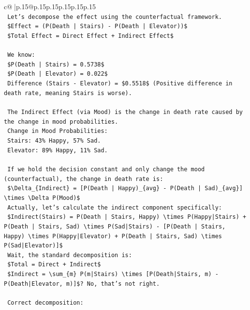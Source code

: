 \documentclass{article}
\begin{document}
{\begin{supertabular}{c@{$\;$}|p{.15\linewidth}@{}p{.15\linewidth}p{.15\linewidth}p{.15\linewidth}p{.15\linewidth}p{.15\linewidth}}
{{{\\ 
\texttt{    Let's decompose the effect using the counterfactual framework.} \\
\texttt{    \$Effect = (P(Death | Stairs) {-} P(Death | Elevator))\$} \\
\texttt{    \$Total Effect = Direct Effect + Indirect Effect\$} \\
\\ 
\texttt{    We know:} \\
\texttt{    \$P(Death | Stairs) = 0.5738\$} \\
\texttt{    \$P(Death | Elevator) = 0.022\$} \\
\texttt{    Difference (Stairs {-} Elevator) = \$0.5518\$ (Positive difference in death rate, meaning Stairs is worse).} \\
\\ 
\texttt{    The Indirect Effect (via Mood) is the change in death rate caused by the change in mood probabilities.} \\
\texttt{    Change in Mood Probabilities:} \\
\texttt{    Stairs: 43\% Happy, 57\% Sad.} \\
\texttt{    Elevator: 89\% Happy, 11\% Sad.} \\
\\ 
\texttt{    If we hold the decision constant and only change the mood (counterfactual), the change in death rate is:} \\
\texttt{    \$\textbackslash{}Delta\_\{Indirect\} = {[}P(Death | Happy)\_\{avg\} {-} P(Death | Sad)\_\{avg\}{]} \textbackslash{}times \textbackslash{}Delta P(Mood)\$} \\
\texttt{    Actually, let's calculate the indirect component specifically:} \\
\texttt{    \$Indirect(Stairs) = P(Death | Stairs, Happy) \textbackslash{}times P(Happy|Stairs) + P(Death | Stairs, Sad) \textbackslash{}times P(Sad|Stairs) {-} {[}P(Death | Stairs, Happy) \textbackslash{}times P(Happy|Elevator) + P(Death | Stairs, Sad) \textbackslash{}times P(Sad|Elevator){]}\$} \\
\texttt{    Wait, the standard decomposition is:} \\
\texttt{    \$Total = Direct + Indirect\$} \\
\texttt{    \$Indirect = \textbackslash{}sum\_\{m\} P(m|Stairs) \textbackslash{}times {[}P(Death|Stairs, m) {-} P(Death|Elevator, m){]}\$? No, that's not right.} \\
\\ 
\texttt{    Correct decomposition:} \\
}}}
\end{supertabular}}
\end{document}
